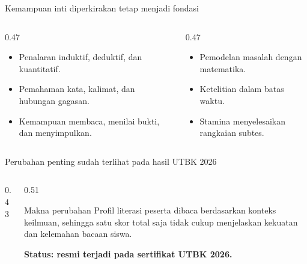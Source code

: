 \begin{frame}{Kemampuan inti diperkirakan tetap menjadi fondasi}
  \begin{columns}[T,onlytextwidth]
    \begin{column}{0.47\textwidth}
      \begin{itemize}
        \item Penalaran induktif, deduktif, dan kuantitatif.
        \item Pemahaman kata, kalimat, dan hubungan gagasan.
        \item Kemampuan membaca, menilai bukti, dan menyimpulkan.
      \end{itemize}
    \end{column}
    \begin{column}{0.47\textwidth}
      \begin{itemize}
        \item Pemodelan masalah dengan matematika.
        \item Ketelitian dalam batas waktu.
        \item Stamina menyelesaikan rangkaian subtes.
      \end{itemize}
    \end{column}
  \end{columns}
  \vspace{0.26cm}
\end{frame}

\begin{frame}{Perubahan penting sudah terlihat pada hasil UTBK 2026}
  \begin{columns}[T,onlytextwidth]
    \begin{column}{0.43\textwidth}
    \end{column}
    \begin{column}{0.51\textwidth}
      \begin{block}{Makna perubahan}
        Profil literasi peserta dibaca berdasarkan konteks keilmuan, sehingga satu skor total saja tidak cukup menjelaskan kekuatan dan kelemahan bacaan siswa.
      \end{block}
      \vspace{0.12cm}
      {\color{StudentGreen}\bfseries\fontsize{11}{13.5}\selectfont Status: resmi terjadi pada sertifikat UTBK 2026.}
    \end{column}
  \end{columns}
\end{frame}

